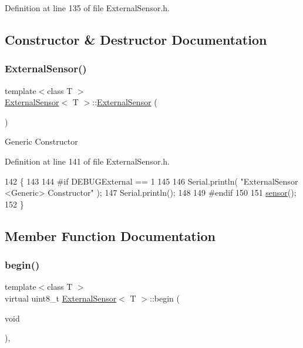 Definition at line 135 of file External\+Sensor.\+h.



\subsection{Constructor \& Destructor Documentation}
\mbox{\label{class_external_sensor_a8b991447fba33253103d06198b838751}} 
\subsubsection{\texorpdfstring{External\+Sensor()}{ExternalSensor()}}
{\footnotesize\ttfamily template$<$class T $>$ \\
\hyperlink{class_external_sensor}{External\+Sensor}$<$ T $>$\+::\hyperlink{class_external_sensor}{External\+Sensor} (\begin{DoxyParamCaption}{ }\end{DoxyParamCaption})\hspace{0.3cm}{\ttfamily [inline]}}

Generic Constructor 

Definition at line 141 of file External\+Sensor.\+h.


\begin{DoxyCode}
142     \{
143     
144 \textcolor{preprocessor}{    #if DEBUGExternal == 1 }
145 
146         Serial.println( \textcolor{stringliteral}{"ExternalSensor <Generic> Constructor"} );
147         Serial.println();
148     
149 \textcolor{preprocessor}{    #endif}
150 
151         \hyperlink{class_external_sensor_a6e1f518119abe08c14b498ce24a7e1b3}{sensor}();
152     \}
\end{DoxyCode}


\subsection{Member Function Documentation}
\mbox{\label{class_external_sensor_ab6fe1379d55b656a048e0fba1e0a32e6}} 
\subsubsection{\texorpdfstring{begin()}{begin()}}
{\footnotesize\ttfamily template$<$class T $>$ \\
virtual uint8\+\_\+t \hyperlink{class_external_sensor}{External\+Sensor}$<$ T $>$\+::begin (\begin{DoxyParamCaption}\item[{void}]{ }\end{DoxyParamCaption})\hspace{0.3cm}{\ttfamily [inline]}, {\ttfamily [virtual]}}

